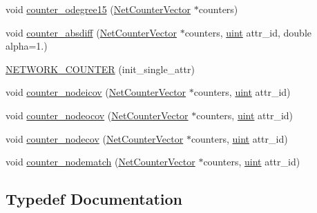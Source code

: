 \begin{DoxyCompactItemize}
\item 
void \hyperlink{namespacebarry_1_1counters_1_1network_a7a43854f3227f5f92d3ff580e99c7136}{counter\+\_\+odegree15} (\hyperlink{namespacebarry_1_1counters_1_1network_a3b3c590303d47840d1967372ae495d95}{Net\+Counter\+Vector} $\ast$counters)
\item 
void \hyperlink{namespacebarry_1_1counters_1_1network_acc210d80021cb5a79f1a9daf097e1c99}{counter\+\_\+absdiff} (\hyperlink{namespacebarry_1_1counters_1_1network_a3b3c590303d47840d1967372ae495d95}{Net\+Counter\+Vector} $\ast$counters, \hyperlink{namespacebarry_a11dfc53ddb4672278319aa04f1e09a6c}{uint} attr\+\_\+id, double alpha=1.)
\item 
\hyperlink{namespacebarry_1_1counters_1_1network_a7649cd035af193258a69058aea425941}{N\+E\+T\+W\+O\+R\+K\+\_\+\+C\+O\+U\+N\+T\+ER} (init\+\_\+single\+\_\+attr)
\item 
void \hyperlink{namespacebarry_1_1counters_1_1network_aef48e4ae85d30c2a949006faee2b5bae}{counter\+\_\+nodeicov} (\hyperlink{namespacebarry_1_1counters_1_1network_a3b3c590303d47840d1967372ae495d95}{Net\+Counter\+Vector} $\ast$counters, \hyperlink{namespacebarry_a11dfc53ddb4672278319aa04f1e09a6c}{uint} attr\+\_\+id)
\item 
void \hyperlink{namespacebarry_1_1counters_1_1network_a2804cd2dba633fdccc7a1ca6a15bdf47}{counter\+\_\+nodeocov} (\hyperlink{namespacebarry_1_1counters_1_1network_a3b3c590303d47840d1967372ae495d95}{Net\+Counter\+Vector} $\ast$counters, \hyperlink{namespacebarry_a11dfc53ddb4672278319aa04f1e09a6c}{uint} attr\+\_\+id)
\item 
void \hyperlink{namespacebarry_1_1counters_1_1network_a7087c6419195bc768c1e8c7730757d2e}{counter\+\_\+nodecov} (\hyperlink{namespacebarry_1_1counters_1_1network_a3b3c590303d47840d1967372ae495d95}{Net\+Counter\+Vector} $\ast$counters, \hyperlink{namespacebarry_a11dfc53ddb4672278319aa04f1e09a6c}{uint} attr\+\_\+id)
\item 
void \hyperlink{namespacebarry_1_1counters_1_1network_ab0a33b2990950574552ab909e6847f96}{counter\+\_\+nodematch} (\hyperlink{namespacebarry_1_1counters_1_1network_a3b3c590303d47840d1967372ae495d95}{Net\+Counter\+Vector} $\ast$counters, \hyperlink{namespacebarry_a11dfc53ddb4672278319aa04f1e09a6c}{uint} attr\+\_\+id)
\end{DoxyCompactItemize}


\subsection{Typedef Documentation}
\mbox{\label{namespacebarry_1_1counters_1_1network_a067bd9de04608fc2e1586324d3864a45}} 

